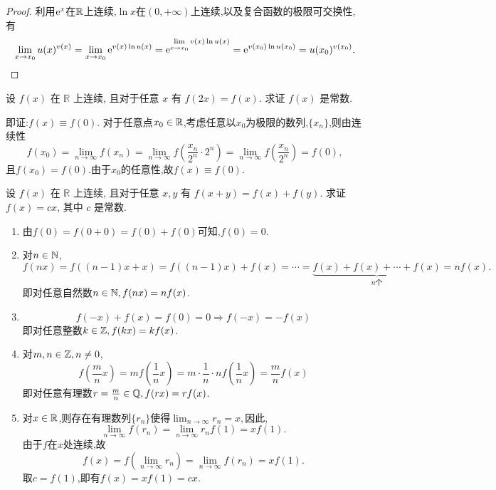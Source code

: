 \begin{proof}
    利用$\mathrm{e}^x$在$\mathbb{R}$上连续,$\ln x$在$(0,+\infty)$上连续,以及复合函数的极限可交换性,有
    $$\lim_{x \to x_0} u(x)^{v(x)} = \lim_{x \to x_0} \mathrm{e}^{v(x) \ln u(x)} = \mathrm{e}^{\lim\limits_{x \to x_0} v(x) \ln u(x)} = \mathrm{e}^{v(x_0) \ln u(x_0)} = u(x_0)^{v(x_0)}.$$
\end{proof}

\begin{exercise}[2.1.14]
    设 $f(x)$ 在 $\mathbb{R}$ 上连续, 且对于任意 $x$ 有 $f(2x)=f(x)$. 求证 $f(x)$ 是常数.
\end{exercise}

\begin{solution}
    即证:$f(x) \equiv f(0)$. 对于任意点$x_0 \in \mathbb{R}$,考虑任意以$x_0$为极限的数列,$\{x_n\}$,则由连续性$$f(x_0)=\lim_{n \to \infty} f(x_n) = \lim_{n \to \infty} f \left( \frac{x_n}{2^n} \cdot 2^n \right) = \lim_{n \to \infty} f\left(\frac{x_n}{2^n}\right) = f(0),$$且$f(x_0) = f(0).$由于$x_0$的任意性,故$f(x) \equiv f(0)$.
\end{solution}

\begin{exercise}[2.1.15]
    设 $f(x)$ 在 $\mathbb{R}$ 上连续, 且对于任意 $x,y$ 有 $f(x+y)=f(x)+f(y)$. 求证 $f(x)=cx$, 其中 $c$ 是常数.
\end{exercise}

\begin{solution}
    \begin{enumerate}
        \item 由$f(0) = f(0+0) = f(0)+f(0)$可知,$f(0) = 0$.
        \item 对$n\in \mathbb{N}$,$$f(nx)=f((n-1)x+x)=f((n-1)x)+f(x)=\cdots = \underset{n\text{个}}{\underbrace{f(x)+f(x)+\cdots +f(x)}}=nf(x).$$
        即对任意自然数$n\in \mathbb{N},f(nx)=nf(x)$.
        \item $$f(-x) + f(x) = f(0) = 0\Rightarrow f(-x) = -f(x)$$
        即对任意整数$k\in \mathbb{Z},f(kx)=kf(x)$.
        \item 对$m,n\in \mathbb{Z},n\neq 0$,$$f\left(\frac{m}{n}x\right) = mf\left(\frac{1}{n}x\right) = m\cdot\frac{1}{n}\cdot nf\left(\frac{1}{n}x\right)=\frac{m}{n}f\left(x\right)$$
        即对任意有理数$r=\frac{m}{n}\in \mathbb{Q},f(rx)=rf(x)$.
        \item 对$x \in \mathbb{R}$,则存在有理数列$\{r_n\}$使得$\lim_{n \to \infty} r_n = x,$因此,$$\lim_{n \to \infty} f(r_n) = \lim_{n \to \infty} r_n f(1) = x f(1).$$
        由于$f$在$x$处连续,故$$f(x)=f(\lim_{n \to \infty} r_n ) =\lim_{n \to \infty} f(r_n) = x f(1).$$
        取$c=f(1)$,即有$f(x)=xf(1)=cx.$
    \end{enumerate}
\end{solution}

